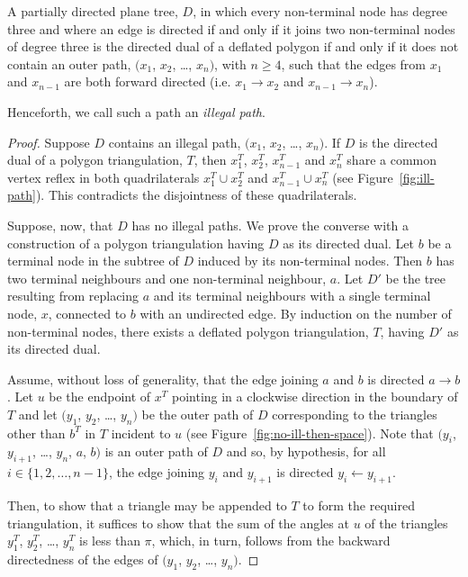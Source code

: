 \documentclass{patmorin}
\begin{document}
\begin{theorem}
  \label{thm:ddd-iff-nip}
  A partially directed plane tree, $D$, in which every non-terminal
  node has degree three and where an edge is directed if and only if
  it joins two non-terminal nodes of degree three is the directed dual
  of a deflated polygon if and only if it does not contain an outer
  path, $(x_1$, $x_2$, \ldots, $x_n)$, with $n\ge 4$, such that the
  edges from $x_1$ and $x_{n-1}$ are both forward directed (i.e.
  $x_1\rightarrow x_2$ and $x_{n-1}\rightarrow x_n$).
\end{theorem}
Henceforth, we call such a path an \emph{illegal path}.
\begin{proof}
  Suppose $D$ contains an illegal path, $(x_1$, $x_2$, \ldots, $x_n)$.
  If $D$ is the directed dual of a polygon triangulation, $T$, then
  $x_1^T$, $x_2^T$, $x_{n-1}^T$ and $x_n^T$ share a common vertex
  reflex in both quadrilaterals $x_1^T\cup x_2^T$ and $x_{n-1}^T\cup
  x_n^T$ (see Figure~\ref{fig:ill-path}).  This contradicts the
  disjointness of these quadrilaterals.
  
  Suppose, now, that $D$ has no illegal paths.  We prove the converse
  with a construction of a polygon triangulation having $D$ as its
  directed dual.  Let $b$ be a terminal node in the subtree of $D$
  induced by its non-terminal nodes.  Then $b$ has two terminal
  neighbours and one non-terminal neighbour, $a$.  Let $D'$ be the
  tree resulting from replacing $a$ and its terminal neighbours with a
  single terminal node, $x$, connected to $b$ with an undirected edge.
  By induction on the number of non-terminal nodes, there exists a
  deflated polygon triangulation, $T$, having $D'$ as its directed
  dual.
  
  Assume, without loss of generality, that the edge joining $a$ and
  $b$ is directed $a\rightarrow b$.  Let $u$ be the endpoint of
  $x^{T}$ pointing in a clockwise direction in the boundary of $T$ and
  let $(y_1$, $y_2$, \ldots, $y_n)$ be the outer path of $D$
  corresponding to the triangles other than $b^{T}$ in $T$ incident to
  $u$ (see Figure~\ref{fig:no-ill-then-space}).  Note that $(y_i$,
  $y_{i+1}$, \ldots, $y_n$, $a$, $b)$ is an outer path of $D$ and so,
  by hypothesis, for all $i\in\{1, 2, \ldots, n-1\}$, the edge joining
  $y_i$ and $y_{i+1}$ is directed $y_i\leftarrow y_{i+1}$.
  
  Then, to show that a triangle may be appended to $T$ to form the
  required triangulation, it suffices to show that the sum of the
  angles at $u$ of the triangles $y_1^{T}$, $y_2^{T}$, \ldots,
  $y_n^{T}$ is less than $\pi$, which, in turn, follows from the
  backward directedness of the edges of $(y_1$, $y_2$, \ldots, $y_n)$.
\end{proof}
\end{document}
